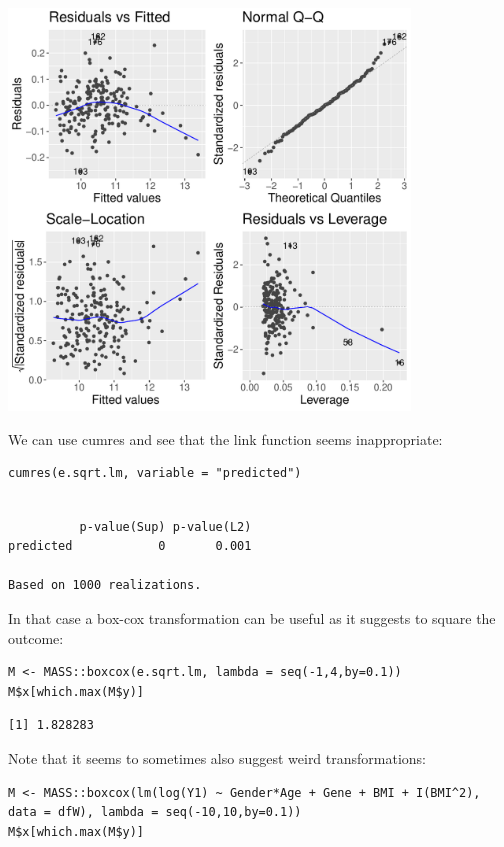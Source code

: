 \documentclass[12pt]{article}
\begin{document}
\begin{center}
\includegraphics[width=0.8\textwidth]{./figures/A1-scale.pdf}
\end{center} 

We can use cumres and see that the link function seems inappropriate:
\lstset{language=r,label= ,caption= ,captionpos=b,numbers=none}
\begin{lstlisting}
cumres(e.sqrt.lm, variable = "predicted")
\end{lstlisting}

\begin{verbatim}

          p-value(Sup) p-value(L2)
predicted            0       0.001

Based on 1000 realizations.
\end{verbatim}

\clearpage

In that case a box-cox transformation can be useful as it suggests to
square the outcome:
\lstset{language=r,label= ,caption= ,captionpos=b,numbers=none}
\begin{lstlisting}
M <- MASS::boxcox(e.sqrt.lm, lambda = seq(-1,4,by=0.1))
M$x[which.max(M$y)]
\end{lstlisting}

\begin{verbatim}
[1] 1.828283
\end{verbatim}

Note that it seems to sometimes also suggest weird transformations:
\lstset{language=r,label= ,caption= ,captionpos=b,numbers=none}
\begin{lstlisting}
M <- MASS::boxcox(lm(log(Y1) ~ Gender*Age + Gene + BMI + I(BMI^2), data = dfW), lambda = seq(-10,10,by=0.1))
M$x[which.max(M$y)]
\end{lstlisting}
\end{document}
